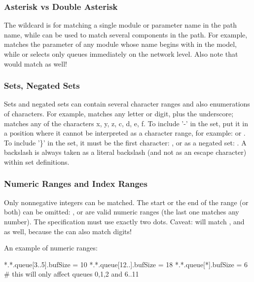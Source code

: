 \subsubsection{Asterisk vs Double Asterisk}
\label{sec:config-sim:asterisk-vs-double-asterisk}

The \ttt{*} wildcard is for matching a single module or parameter name in the
path name, while \ttt{**} can be used to match several components in the path.
For example,  matches the  parameter of any module
whose name begins with  in the model, while 
or  selects only queues immediately on the network level.
Also note that  would match 
as well!

\subsubsection{Sets, Negated Sets}
\label{sec:config-sim:sets-negated-sets}

Sets and negated sets can contain several character ranges and also
enumerations of characters. For example,  matches any letter
or digit, plus the underscore;  matches any of the characters
x, y, z, c, d, e, f.
To include '-' in the set, put it in a position where it cannot be
interpreted as a character range, for example:  or .
To include '\}' in the set, it must be the first character: ,
or as a negated set: .
A backslash is always taken as a literal backslash (and not as an escape
character) within set definitions.


\subsubsection{Numeric Ranges and Index Ranges}
\label{sec:config-sim:numeric-ranges-and-index-ranges}

Only nonnegative integers can be matched.  The start or the end of the range
(or both) can be omitted: ,  or 
are valid numeric ranges (the last one matches any number).
The specification must use exactly two dots.
Caveat:  will match ,  and  as well,
because the \ttt{*} can also match digits!

An example of numeric ranges:

\begin{inifile}
[General]
*.*.queue[3..5].bufSize = 10
*.*.queue[12..].bufSize = 18
*.*.queue[*].bufSize = 6  # this will only affect queues 0,1,2 and 6..11
\end{inifile}


